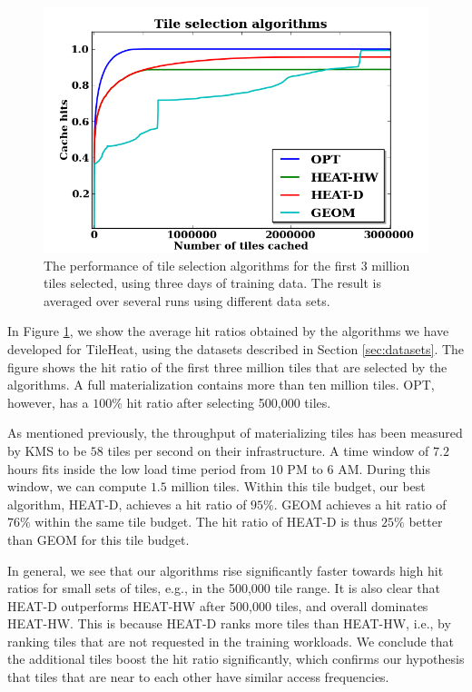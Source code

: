 \documentclass[11pt, oneside]{report}
\begin{document}
{\begin{figure}
\centering
\includegraphics[scale=0.4]{figs-tileheat/results_closeup2.png}
\caption{The performance of tile selection algorithms for the first 3 million tiles selected, using three days of training data. The result is averaged over several runs using different data sets.}
\label{fig:results}
\end{figure}

In Figure \ref{fig:results}, we show the average hit ratios obtained by the algorithms we have developed for TileHeat, using the datasets described in Section \ref{sec:datasets}. 
The figure shows the hit ratio of the first three million tiles that are selected by the algorithms. A full materialization contains more than ten million tiles. OPT, however, has a $100\%$ hit ratio after selecting 500,000 tiles. 

As mentioned previously, the throughput of materializing tiles has been measured by KMS to be $58$ tiles per second on their infrastructure. A time window of $7.2$ hours fits inside the low load time period from $10$ PM to $6$ AM. During this window, we can compute $1.5$ million tiles. Within this tile budget, our best algorithm, HEAT-D, achieves a hit ratio of $95\%$. GEOM achieves a hit ratio of $76\%$ within the same tile budget. The hit ratio of HEAT-D is thus $25\%$ better than GEOM for this tile budget.

In general, we see that our algorithms rise significantly faster towards high hit ratios for small sets of tiles, e.g., in the 500,000 tile range. It is also clear that HEAT-D outperforms HEAT-HW after 500,000 tiles, and overall dominates HEAT-HW. This is because HEAT-D ranks more tiles than HEAT-HW, i.e., by ranking tiles that are not requested in the training workloads. We conclude that the additional tiles boost the hit ratio significantly, which confirms our hypothesis that tiles that are near to each other have similar access frequencies.

}
\end{document}
